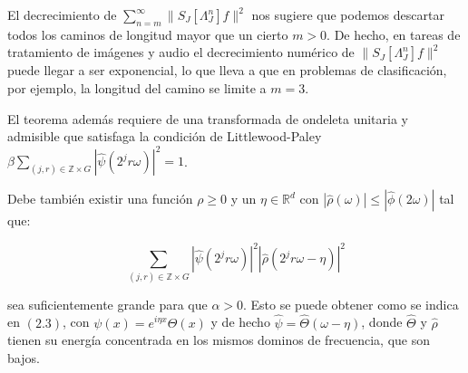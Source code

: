 \medskip

\noindent El decrecimiento de $\sum_{n=m}^\infty \| S_J[\Lambda_J^n]f\|^2$ nos sugiere que podemos descartar todos los caminos de longitud mayor que un cierto $m>0$. De hecho, en tareas de tratamiento de imágenes y audio el decrecimiento numérico de $\|S_J[\Lambda_J^n]f\|^2$ puede llegar a ser exponencial, lo que lleva a que en problemas de clasificación, por ejemplo, la longitud del camino se limite a $m=3$.

\medskip

\noindent El teorema además requiere de una transformada de ondeleta unitaria y admisible que satisfaga la condición de Littlewood-Paley $\beta \sum_{(j,r)\in \mathbb{Z}\times G}|\widehat{\psi}(2^jr\omega)|^2=1$. 

\medskip

\noindent Debe también existir una función $\rho \geq 0$ y un $\eta \in \mathbb{R}^d$ con $|\widehat{\rho}(\omega)|\leq |\widehat{\phi}(2\omega)|$ tal que: 

$$\sum_{(j,r)\in\mathbb{Z}\times G}|\widehat{\psi}(2^jr\omega)|^2|\widehat{\rho}(2^jr\omega-\eta)|^2$$

\noindent sea suficientemente grande para que $\alpha>0$. Esto se puede obtener como se indica en $(2.3)$, con $\psi(x)=e^{i\eta x}\Theta(x)$ y de hecho $\widehat{\psi}=\widehat{\Theta}(\omega-\eta)$, donde $\widehat{\Theta}$ y $\widehat{\rho}$ tienen su energía concentrada en los mismos dominos de frecuencia, que son bajos.

\endinput